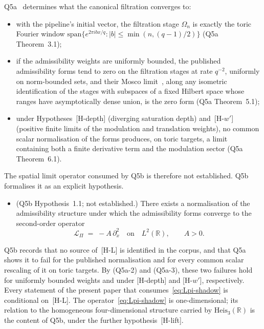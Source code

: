 \documentclass[11pt,a4paper]{article}
\begin{document}
    Q5a~\cite{Beau2026q5a} determines what the canonical filtration converges to:
    \begin{itemize}
      \item[(Q5a-1)] with the pipeline's initial vector, the filtration stage $\Omega_n$ is exactly the toric Fourier
      window $\mathrm{span}\{e^{2\pi i b x/q} : |b| \le \min(n, (q-1)/2)\}$ (Q5a Theorem~3.1);
      \item[(Q5a-2)] if the admissibility weights are uniformly bounded, the published admissibility forms tend to zero
      on the filtration stages at rate $q^{-2}$, uniformly on norm-bounded sets, and their Mosco
      limit~\cite{Mosco1969,KuwaeShioya2003}, along any isometric identification of the stages with subspaces of a fixed
      Hilbert space whose ranges have asymptotically dense union, is the zero form (Q5a Theorem~5.1);
      \item[(Q5a-3)] under Hypotheses~[H-depth] (diverging saturation depth) and~[H-$w'$] (positive finite limits of the
      modulation and translation weights), no common scalar normalisation of the forms produces, on toric targets, a
      limit containing both a finite derivative term and the modulation sector (Q5a Theorem~6.1).
    \end{itemize}
    The spatial limit operator consumed by Q5b is therefore not established.
    Q5b~\cite{Beau2026q5b} formalises it as an explicit hypothesis.
    \begin{itemize}
      \item[{[H-L]}] (Q5b Hypothesis~1.1; not established.)
      There exists a normalisation of the admissibility structure under which the admissibility forms converge to the
      second-order operator
      \begin{equation}
        \label{eq:Lpi-shadow}
        \mathcal{L}_\Pi \;=\; -A\,\partial_x^2
        \quad\text{on}\quad L^2(\mathbb{R}),
        \qquad A > 0.
      \end{equation}
    \end{itemize}
    Q5b records that no source of~[H-L] is identified in the corpus, and that Q5a shows it to fail for the published
    normalisation and for every common scalar rescaling of it on toric targets.
    By (Q5a-2) and (Q5a-3), these two failures hold for uniformly bounded weights and under [H-depth] and [H-$w'$],
    respectively.
    Every statement of the present paper that consumes~\eqref{eq:Lpi-shadow} is conditional on~[H-L].
    The operator~\eqref{eq:Lpi-shadow} is one-dimensional; its relation to the homogeneous four-dimensional structure
    carried by $\mathrm{Heis}_3(\mathbb{R})$ is the content of Q5b, under the further hypothesis~[H-lift].
\end{document}
